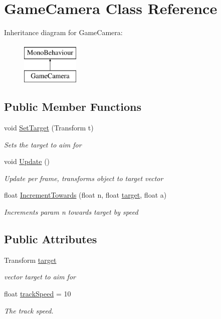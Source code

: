 \hypertarget{classGameCamera}{\section{Game\-Camera Class Reference}
\label{classGameCamera}
}
Inheritance diagram for Game\-Camera\-:\begin{figure}[H]
\begin{center}
\leavevmode
\includegraphics[height=2.000000cm]{classGameCamera}
\end{center}
\end{figure}
\subsection*{Public Member Functions}
\begin{DoxyCompactItemize}
\item 
void \hyperlink{classGameCamera_adb2bfc4c2738e33d9b98bc97fddacb4e}{Set\-Target} (Transform t)
\begin{DoxyCompactList}\small\item\em Sets the target to aim for \end{DoxyCompactList}\item 
void \hyperlink{classGameCamera_aa6ef15e6deb0f8921cdb93c9ad719ca0}{Update} ()
\begin{DoxyCompactList}\small\item\em Update per frame, transforms object to target vector \end{DoxyCompactList}\item 
float \hyperlink{classGameCamera_adb57e107c5ac3c860c1d31589453c9a4}{Increment\-Towards} (float n, float \hyperlink{classGameCamera_a952c82b1dd2710a4af6fe0fbeaca776c}{target}, float a)
\begin{DoxyCompactList}\small\item\em Increments param n towards target by speed \end{DoxyCompactList}\end{DoxyCompactItemize}
\subsection*{Public Attributes}
\begin{DoxyCompactItemize}
\item 
Transform \hyperlink{classGameCamera_a952c82b1dd2710a4af6fe0fbeaca776c}{target}
\begin{DoxyCompactList}\small\item\em vector target to aim for \end{DoxyCompactList}\item 
float \hyperlink{classGameCamera_af9039782e227fc39fa15528908e37137}{track\-Speed} = 10
\begin{DoxyCompactList}\small\item\em The track speed. \end{DoxyCompactList}\end{DoxyCompactItemize}


